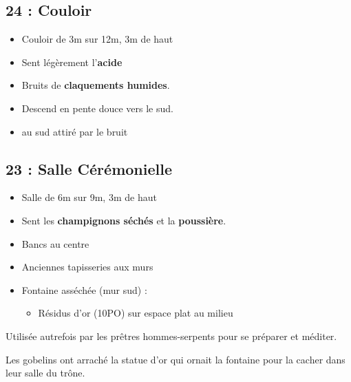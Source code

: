 \subsection{24 : Couloir}\label{n3:s24}
\begin{itemize}
  \item Couloir de 3m sur 12m, 3m de haut
  \item Sent légèrement l'\textbf{acide}
  \item Bruits de \textbf{claquements humides}.
  \item Descend en pente douce vers le sud.
  \item \textbf{} au sud attiré par le bruit
\end{itemize}

\vfill

\subsection{23 : Salle Cérémonielle}\label{n3:s23}
\begin{itemize}
  \item Salle de 6m sur 9m, 3m de haut
  \item Sent les \textbf{champignons séchés} et la \textbf{poussière}.
  \item Bancs au centre
  \item Anciennes tapisseries aux murs
  \item Fontaine asséchée (mur sud) :
  \begin{itemize}
    \item Résidus d'or (10PO) sur espace plat au milieu
  \end{itemize}
\end{itemize}

Utilisée autrefois par les prêtres hommes-serpents pour se préparer et méditer.

Les gobelins ont arraché la statue d'or qui ornait la fontaine pour la cacher dans leur salle du trône.

